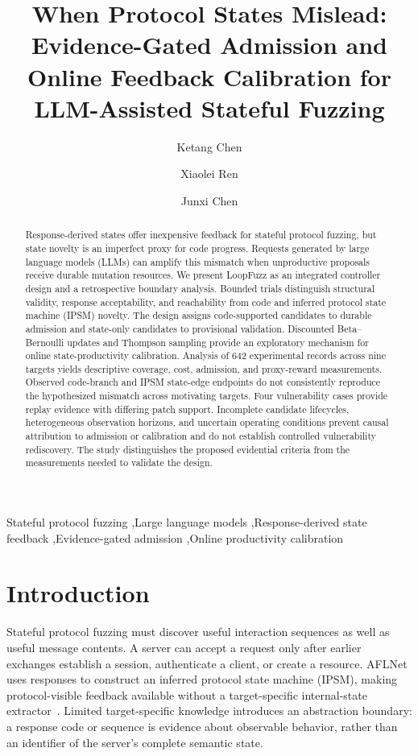 \documentclass[final,5p,times,number]{elsarticle}
\begin{document}
\raggedbottom
\begin{frontmatter}
\title{When Protocol States Mislead: Evidence-Gated Admission and Online Feedback Calibration for LLM-Assisted Stateful Fuzzing}
\author[inst1]{Ketang Chen}
\author[inst1]{Xiaolei Ren}
\author[inst1]{Junxi Chen}
\begin{abstract}
Response-derived states offer inexpensive feedback for stateful protocol fuzzing, but state novelty is an imperfect proxy for code progress. Requests generated by large language models (LLMs) can amplify this mismatch when unproductive proposals receive durable mutation resources. We present LoopFuzz as an integrated controller design and a retrospective boundary analysis. Bounded trials distinguish structural validity, response acceptability, and reachability from code and inferred protocol state machine (IPSM) novelty. The design assigns code-supported candidates to durable admission and state-only candidates to provisional validation. Discounted Beta--Bernoulli updates and Thompson sampling provide an exploratory mechanism for online state-productivity calibration. Analysis of 642 experimental records across nine targets yields descriptive coverage, cost, admission, and proxy-reward measurements. Observed code-branch and IPSM state-edge endpoints do not consistently reproduce the hypothesized mismatch across motivating targets. Four vulnerability cases provide replay evidence with differing patch support. Incomplete candidate lifecycles, heterogeneous observation horizons, and uncertain operating conditions prevent causal attribution to admission or calibration and do not establish controlled vulnerability rediscovery. The study distinguishes the proposed evidential criteria from the measurements needed to validate the design.
\end{abstract}
\begin{keyword}
Stateful protocol fuzzing \sep Large language models \sep Response-derived state feedback \sep Evidence-gated admission \sep Online productivity calibration
\end{keyword}
\end{frontmatter}

\section{Introduction}
Stateful protocol fuzzing must discover useful interaction sequences as well as useful message contents. A server can accept a request only after earlier exchanges establish a session, authenticate a client, or create a resource. AFLNet uses responses to construct an inferred protocol state machine (IPSM), making protocol-visible feedback available without a target-specific internal-state extractor~\cite{aflnet}. Limited target-specific knowledge introduces an abstraction boundary: a response code or sequence is evidence about observable behavior, rather than an identifier of the server's complete semantic state.
\end{document}
